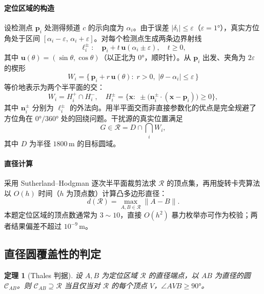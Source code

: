 \documentclass[12pt,a4paper]{ctexart}
\newtheorem{theorem}{定理}[section]
\begin{document}
\paragraph{定位区域的构造}
设检测点 $\bm{p}_i$ 处测得频道 $c$ 的示向度为 $\alpha_i$。由于误差 $|\delta_i|\le\varepsilon$（$\varepsilon=1°$），真实方位角处于区间 $[\alpha_i-\varepsilon,\,\alpha_i+\varepsilon]$。对每个检测点生成两条边界射线
\begin{equation}
  \ell_i^{\pm}:\quad \bm{p}_i + t\,\bm{u}(\alpha_i\pm\varepsilon),\quad t\ge0,
\end{equation}
其中 $\bm{u}(\theta)=(\sin\theta,\cos\theta)$（以正北为 $0°$，顺时针）。从 $\bm{p}_i$ 出发、夹角为 $2\varepsilon$ 的楔形
\begin{equation}
  W_i=\bigl\{\,\bm{p}_i+r\,\bm{u}(\theta):\;r>0,\;|\theta-\alpha_i|\le\varepsilon\,\bigr\}
\end{equation}
等价地表示为两个半平面的交：
\begin{equation}
  W_i=H_i^+\cap H_i^-,\quad
  H_i^{\pm}=\bigl\{\bm{x}:\;\pm\bigl(\bm{n}_i^{\pm}\cdot(\bm{x}-\bm{p}_i)\bigr)\ge0\bigr\},
\end{equation}
其中 $\bm{n}_i^{\pm}$ 分别为 $\ell_i^{\pm}$ 的外法向。用半平面交而非直接参数化的优点是完全规避了方位角在 $0°/360°$ 处的回绕问题。干扰源的真实位置满足
\begin{equation}
  G\in\mathcal{R}=D\cap\bigcap_{i}W_i,
  \label{eq:feasible}
\end{equation}
其中 $D$ 为半径 $1800\,\text{m}$ 的目标圆域。

\paragraph{直径计算}
采用 Sutherland--Hodgman 逐次半平面裁剪法求 $\mathcal{R}$ 的顶点集，再用旋转卡壳算法以 $O(h)$ 时间（$h$ 为顶点数）计算凸多边形直径：
\begin{equation}
  d(\mathcal{R})=\max_{A,B\in\mathcal{R}}\|A-B\|.
\end{equation}
本题定位区域的顶点数通常为 $3\sim10$，直接 $O(h^2)$ 暴力枚举亦可作为校验；两者结果偏差不超过 $10^{-9}\,\text{m}$。

\subsection{直径圆覆盖性的判定}

\begin{theorem}[Thales 判据]
设 $A,B$ 为定位区域 $\mathcal{R}$ 的直径端点，以 $AB$ 为直径的圆 $\mathcal{C}_{AB}$。则 $\mathcal{C}_{AB}\supseteq\mathcal{R}$ 当且仅当对 $\mathcal{R}$ 的每个顶点 $V$，$\angle AVB\ge90°$。
\end{theorem}
\end{document}
